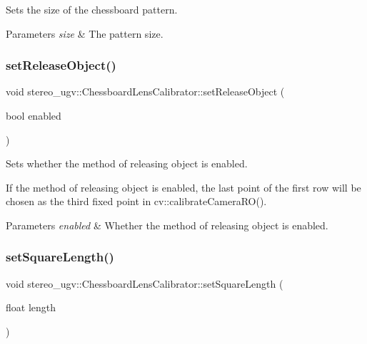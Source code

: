 Sets the size of the chessboard pattern. 


\begin{DoxyParams}{Parameters}
{\em size} & The pattern size. \\
\hline
\end{DoxyParams}
\mbox{\label{classstereo__ugv_1_1ChessboardLensCalibrator_a438ea74bec4002b39dee1985cba88948}} 
\subsubsection{\texorpdfstring{set\+Release\+Object()}{setReleaseObject()}}
{\footnotesize\ttfamily void stereo\+\_\+ugv\+::\+Chessboard\+Lens\+Calibrator\+::set\+Release\+Object (\begin{DoxyParamCaption}\item[{bool}]{enabled }\end{DoxyParamCaption})}



Sets whether the method of releasing object is enabled. 

If the method of releasing object is enabled, the last point of the first row will be chosen as the third fixed point in cv\+::calibrate\+Camera\+R\+O(). 
\begin{DoxyParams}{Parameters}
{\em enabled} & Whether the method of releasing object is enabled. \\
\hline
\end{DoxyParams}
\mbox{\label{classstereo__ugv_1_1ChessboardLensCalibrator_a232059124de2dcb4467bd2a586c75273}} 
\subsubsection{\texorpdfstring{set\+Square\+Length()}{setSquareLength()}}
{\footnotesize\ttfamily void stereo\+\_\+ugv\+::\+Chessboard\+Lens\+Calibrator\+::set\+Square\+Length (\begin{DoxyParamCaption}\item[{float}]{length }\end{DoxyParamCaption})}



